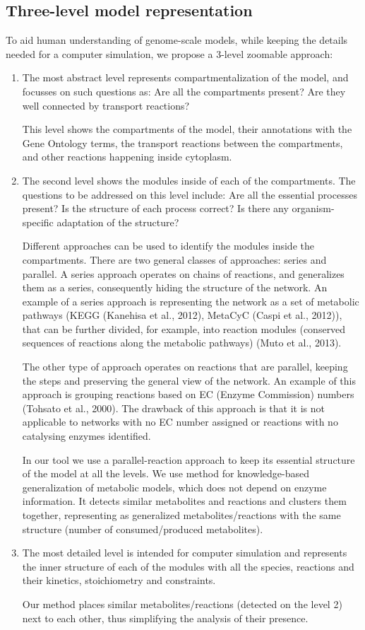 \documentclass{bioinfo}
\begin{document}
\subsection*{Three-level model representation}
To aid human understanding of genome-scale models, while keeping the details needed for a computer simulation, we propose a 3-level zoomable approach:
\begin{enumerate}
\item The most abstract level represents compartmentalization of the model, and focusses on such questions as: Are all the compartments present? Are they well connected by transport reactions?

This level shows the compartments of the model, their annotations with the Gene Ontology terms, the transport reactions between the compartments, and other reactions happening inside cytoplasm.

\item The second level shows the modules inside of each of the compartments. The questions to be addressed on this level include: Are all the essential processes present? Is the structure of each process correct? Is there any organism-specific adaptation of the structure?

Different approaches can be used to identify the modules inside the compartments. There are two general classes of approaches: series and parallel. A series approach operates on chains of reactions, and generalizes them as a series, consequently hiding the structure of the network. An example of a series approach is representing the network as a set of metabolic pathways (KEGG (Kanehisa et al., 2012), MetaCyC (Caspi et al., 2012)), that can be further divided, for example, into reaction modules (conserved sequences of reactions along the metabolic pathways) (Muto et al., 2013). 

The other type of approach operates on reactions that are parallel, keeping the steps and preserving the general view of the network. An example of this approach is grouping reactions based on EC (Enzyme Commission) numbers (Tohsato et al., 2000). The drawback of this approach is that it is not applicable to networks with no EC number assigned or reactions with no catalysing enzymes identified. 

In our tool we use a parallel-reaction approach to keep its essential structure of the model at all the levels. We use method for knowledge-based generalization of metabolic models, which does not depend on enzyme information. It detects similar metabolites and reactions and clusters them together, representing as generalized metabolites/reactions with the same structure (number of consumed/produced metabolites).

\item The most detailed level is intended for computer simulation and represents the inner structure of each of the modules with all the species, reactions and their kinetics, stoichiometry and constraints.

Our method places similar metabolites/reactions (detected on the level 2) next to each other, thus simplifying the analysis of their presence.

\end{enumerate}
\end{document}
